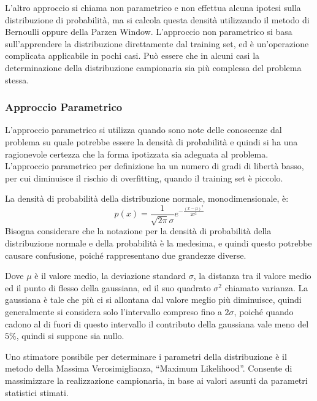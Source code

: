 \documentclass{article}
\numberwithin{equation}{subsection}
\begin{document}
L'altro approccio si chiama non parametrico e non effettua alcuna ipotesi sulla distribuzione di probabilità, ma si calcola questa densità utilizzando il metodo di Bernoulli oppure della Parzen Window.
L'approccio non parametrico si basa sull'apprendere la distribuzione direttamente dal training set, ed è un'operazione complicata applicabile in pochi casi. Può essere che in alcuni casi la determinazione della distribuzione campionaria sia più complessa del problema stessa. 

\subsubsection{Approccio Parametrico}

L'approccio parametrico si utilizza quando sono note delle conoscenze dal problema su quale potrebbe essere la densità di probabilità e quindi si ha una ragionevole certezza che la forma ipotizzata sia adeguata al problema. L'approccio parametrico per definizione ha un numero di gradi di libertà basso, per cui diminuisce il rischio di overfitting, quando il training set è piccolo. 

La densità di probabilità della distribuzione normale, monodimensionale, è:
\begin{equation*}
    p(x)=\displaystyle\frac{1}{\sqrt{2\pi}\sigma}e^{-\frac{(x-\mu)^2}{2\sigma^2}}
\end{equation*}
Bisogna considerare che la notazione per la densità di probabilità della distribuzione normale e della probabilità è la medesima, e quindi questo potrebbe causare confusione, poiché rappresentano due grandezze diverse. 

Dove $\mu$ è il valore medio, la deviazione standard $\sigma$, la distanza tra il valore medio ed il punto di flesso della gaussiana, ed il suo quadrato $\sigma^2$ chiamato varianza. 
La gaussiana è tale che più ci si allontana dal valore meglio più diminuisce, quindi generalmente si considera solo l'intervallo compreso fino a $2\sigma$, poiché quando cadono al di fuori di questo intervallo il contributo della gaussiana vale meno del $5\%$, quindi si suppone sia nullo. 

Uno stimatore possibile per determinare i parametri della distribuzione è il metodo della 
Massima Verosimiglianza, ``Maximum Likelihood''. Consente di massimizzare la realizzazione campionaria, in base ai valori assunti da parametri statistici stimati. 
\end{document}
